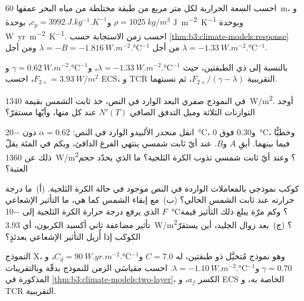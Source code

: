 \begin{exercise}[$\star$]\label{exo:b3:climate-models:3}
احسب السعة الحرارية لكل متر مربع من طبقة مختلطة من مياه البحر
عمقها \qty{60}{m}، و$\rho = \qty{1025}{kg/m^3}$ و$c_p = \qty{3992}{J.kg^{-1}.K^{-1}}$،
بوحدة \unit{J.m^{-2}.K^{-1}} وبوحدة \unit{W.yr.m^{-2}.K^{-1}}. احسب
زمن الاستجابة حسب \cref{thm:b3:climate-models:response} من أجل $\lambda = -B =
\qty{-1.816}{W.m^{-2}.\celsius^{-1}}$ ومن أجل $\lambda =
\qty{-1.33}{W.m^{-2}.\celsius^{-1}}$.
\end{exercise}

\begin{exercise}[$\star$]\label{exo:b3:climate-models:4}
بالنسبة إلى  ذي الطبقتين، حيث $\lambda = \qty{-1.33}{W.m^{-2}.\celsius^{-1}}$،
و$\gamma = \qty{0.62}{W.m^{-2}.\celsius^{-1}}$ و$F_{2\times} =
\qty{3.93}{W/m^2}$، احسب ECS، و TCR التقريبية $F_{2\times}/
(\gamma - \lambda)$، ثم نسبتهما.
\end{exercise}

\begin{exercise}[$\star\star$]\label{exo:b3:climate-models:5}
في النموذج صفري البعد الوارد في النص، خذ ثابت الشمس بقيمة
\qty{1340}{W/m^2}. أوجد التوازنات الثلاثة وميل التدفق الصافي $N'(T)$
عند كل منها، وأيّها مستقرّ؟
\end{exercise}

\begin{exercise}[$\star\star$]\label{exo:b3:climate-models:6}
انقل منحدر الألبيدو الوارد في النص: $\alpha = 0.62$ دون \qty{-20}{\celsius}،
و$0.30$ فوق \qty{0}{\celsius}، وخطيًّا فيما بينهما. أبقِ $A$ و$B$. عند أيّ
ثابت شمسي ينتهي الفرع الدافئ، وبكم في المئة يقلّ ذلك عن
\qty{1360}{W/m^2}؟ وعند أيّ ثابت شمسي تذوب الكرة الثلجية؟
ما الذي يحدّد حجم العتبة؟
\end{exercise}

\begin{exercise}[$\star\star$]\label{exo:b3:climate-models:7}
كوكب نموذجي بالمعاملات الواردة في النص موجود في حالة الكرة الثلجية.
(أ)~ما درجة حرارته عند ثابت الشمس الحالي؟ (ب)~مع إبقاء الشمس
كما هي، ما التأثير الإشعاعي $F$ الذي يرفع درجة حرارة الكرة الثلجية إلى
\qty{-10}{\celsius}؟ وكم مرّة يبلغ ذلك التأثير قيمة تأثير مضاعفة ثاني أكسيد الكربون،
أي \qty{3.93}{W/m^2}؟ (ج)~بعد زوال الجليد، أين يستقرّ
الكوكب إذا أُزيل التأثير الإشعاعي بعدئذٍ؟
\end{exercise}

\begin{exercise}[$\star\star$]\label{exo:b3:climate-models:8}
النموذج X، وهو نموذج مُتخيَّل ذو طبقتين، له $C = 7.0$ و$C_d =
\qty{90}{W.yr.m^{-2}.\celsius^{-1}}$، و$\gamma = 0.70$ و$\lambda =
\qty{-1.10}{W.m^{-2}.\celsius^{-1}}$. احسب مقياسَي الزمن للنموذج بدقّة
وبالتقريبات المذكورة في \cref{thm:b3:climate-models:two-layer}، الكسر
$a_f$، و ECS الخاصة به، و TCR التقريبية.
\end{exercise}

